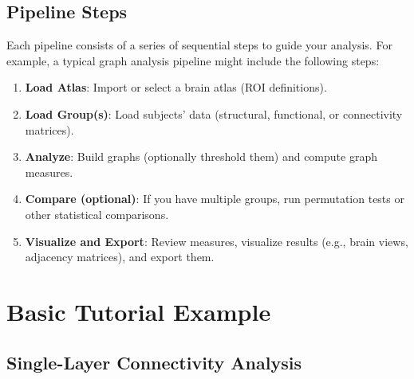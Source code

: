 \documentclass[justified]{tufte-handout}
\begin{document}
\subsection{Pipeline Steps}

Each pipeline consists of a series of sequential steps to guide your analysis. For example, a typical graph analysis pipeline might include the following steps:
\begin{enumerate}
    \item \textbf{Load Atlas}: Import or select a brain atlas (ROI definitions).
    \item \textbf{Load Group(s)}: Load subjects' data (structural, functional, or connectivity matrices).
    \item \textbf{Analyze}: Build graphs (optionally threshold them) and compute graph measures.
    \item \textbf{Compare (optional)}: If you have multiple groups, run permutation tests or other statistical comparisons.
    \item \textbf{Visualize and Export}: Review measures, visualize results (e.g., brain views, adjacency matrices), and export them.
\end{enumerate}

\section{Basic Tutorial Example}

\subsection{Single-Layer Connectivity Analysis}
\end{document}
